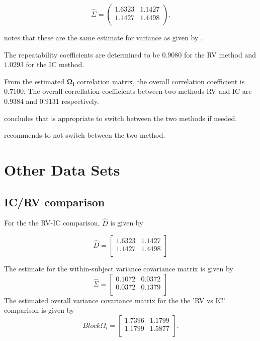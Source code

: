\documentclass[12pt, a4paper]{report}
\theoremstyle{plain}
\theoremstyle{definition}
\theoremstyle{remark}
\begin{document}
\begin{equation}\hat{\Sigma}=\left(
\begin{array}{cc}
1.6323 & 1.1427 \\
1.1427 & 1.4498 \\
\end{array}
\right).
\end{equation}

\citet{ARoy2009} notes that these are the same estimate for variance as given by \citet{BA99}.


The repeatability coefficients are determined to be $0.9080$ for the RV method and $1.0293$ for the IC method.

From the estimated $\boldsymbol{\Omega_{i}}$ correlation matrix, the overall correlation coefficient is $0.7100$.
The overall correllation coefficients between two methods RV and IC are $0.9384$ and $0.9131$ respectively.

\citet{ARoy2009} concludes that is appropriate to switch between the two methods if needed.



\citet{ARoy2009} recommends to not switch between the two method.




\chapter{Other Data Sets}
\section{IC/RV comparison}

For the the RV-IC comparison, $\hat{D}$ is given by


\begin{equation}
\hat{D}= \left[ \begin{array}{cc}
1.6323 & 1.1427  \\
1.1427 & 1.4498 \\
\end{array} \right]
\end{equation}

The estimate for the within-subject variance covariance matrix is
given by
\begin{equation}
\hat{\Sigma}= \left[ \begin{array}{cc}
0.1072 & 0.0372  \\
0.0372 & 0.1379  \\
\end{array}\right]
\end{equation}
The estimated overall variance covariance matrix for the the 'RV
vs IC' comparison is given by
\begin{equation}
Block \Omega_{i}= \left[ \begin{array}{cc}
1.7396 & 1.1799  \\
1.1799 & 1.5877  \\
\end{array} \right].
\end{equation}
\end{document}
